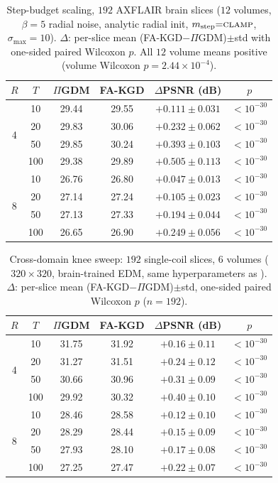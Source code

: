 \documentclass[10pt,twocolumn,letterpaper]{article}
\begin{document}
\begin{table}[H]
\centering
\caption{Step-budget scaling, $192$ AXFLAIR brain slices ($12$ volumes,
$\beta{=}5$ radial noise, analytic radial init,
$m_{\text{step}}{=}\textsc{clamp}$, $\sigma_{\max}{=}10$).
$\Delta$: per-slice mean (FA-KGD$-\Pi$GDM)$\pm$std with one-sided paired
Wilcoxon $p$. All $12$ volume means positive
(volume Wilcoxon $p{=}2.44{\times}10^{-4}$).}
\label{tab:tscaling}
\setlength{\tabcolsep}{4pt}
\begin{tabular}{@{}c c c c c c@{}}
\toprule
$R$ & $T$ & $\Pi$GDM & FA-KGD & $\Delta$PSNR (dB) & $p$ \\
\midrule
\multirow{4}{*}{4}
 & 10  & 29.44 & 29.55 & $+0.111\pm0.031$ & $<10^{-30}$ \\
 & 20  & 29.83 & 30.06 & $+0.232\pm0.062$ & $<10^{-30}$ \\
 & 50  & 29.85 & 30.24 & $+0.393\pm0.103$ & $<10^{-30}$ \\
 & 100 & 29.38 & 29.89 & $\mathbf{+0.505\pm0.113}$ & $<10^{-30}$ \\
\midrule
\multirow{4}{*}{8}
 & 10  & 26.76 & 26.80 & $+0.047\pm0.013$ & $<10^{-30}$ \\
 & 20  & 27.14 & 27.24 & $+0.105\pm0.023$ & $<10^{-30}$ \\
 & 50  & 27.13 & 27.33 & $+0.194\pm0.044$ & $<10^{-30}$ \\
 & 100 & 26.65 & 26.90 & $\mathbf{+0.249\pm0.056}$ & $<10^{-30}$ \\
\bottomrule
\end{tabular}
\end{table}

\begin{table}[H]
\centering
\caption{Cross-domain knee sweep: $192$ single-coil slices, $6$ volumes
($320{\times}320$, brain-trained EDM, same hyperparameters as
). $\Delta$: per-slice mean (FA-KGD$-\Pi$GDM)$\pm$std,
one-sided paired Wilcoxon $p$ ($n{=}192$).}
\label{tab:tscaling_knee}
\setlength{\tabcolsep}{4pt}
\begin{tabular}{@{}c c c c c c@{}}
\toprule
$R$ & $T$ & $\Pi$GDM & FA-KGD & $\Delta$PSNR (dB) & $p$ \\
\midrule
\multirow{4}{*}{4}
 & 10  & 31.75 & 31.92 & $+0.16\pm0.11$ & $<10^{-30}$ \\
 & 20  & 31.27 & 31.51 & $+0.24\pm0.12$ & $<10^{-30}$ \\
 & 50  & 30.66 & 30.96 & $+0.31\pm0.09$ & $<10^{-30}$ \\
 & 100 & 29.92 & 30.32 & $\mathbf{+0.40\pm0.10}$ & $<10^{-30}$ \\
\midrule
\multirow{4}{*}{8}
 & 10  & 28.46 & 28.58 & $+0.12\pm0.10$ & $<10^{-30}$ \\
 & 20  & 28.29 & 28.44 & $+0.15\pm0.09$ & $<10^{-30}$ \\
 & 50  & 27.93 & 28.10 & $+0.17\pm0.08$ & $<10^{-30}$ \\
 & 100 & 27.25 & 27.47 & $\mathbf{+0.22\pm0.07}$ & $<10^{-30}$ \\
\bottomrule
\end{tabular}
\end{table}
\end{document}

